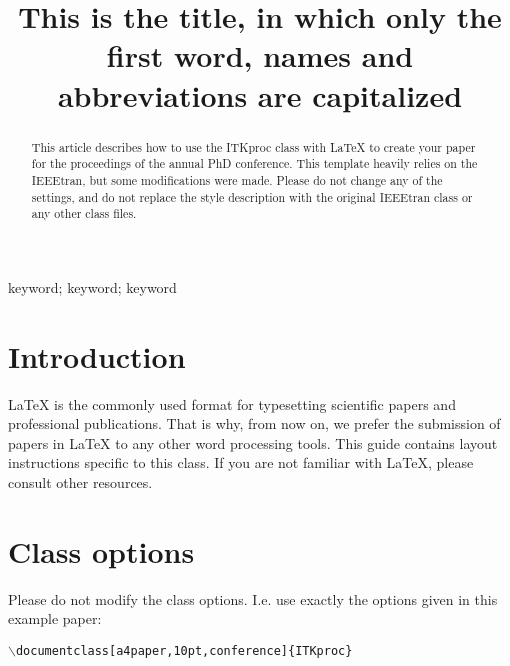 \documentclass[10pt, conference,a4paper]{ITKproc}
\begin{document}
%
\title{This is the title, in which only the first word, names and abbreviations are capitalized}

\author{
}

\maketitle

\begin{abstract}
This article describes how to use the ITKproc class with {\LaTeX} to create your paper for the proceedings of the annual PhD conference. This template heavily relies on the IEEEtran, but some modifications were made. Please do not change any of the settings, and do not replace the style description with the original IEEEtran class or any other class files.    

\end{abstract}
\begin{IEEEkeywords}
keyword; keyword; keyword
\end{IEEEkeywords}
\IEEEpeerreviewmaketitle

\section{Introduction}

{\LaTeX} is the commonly used format for typesetting scientific papers and professional publications. That is why, from now on, we prefer the submission of papers in {\LaTeX} to any other word processing tools. This guide contains layout instructions specific to this class. If you are not familiar with {\LaTeX}, please consult other resources.


\section{Class options}
Please do not modify the class options. I.e. use exactly the options given in this example paper:
\vspace{3mm}
\begin{small}
 \texttt{$\backslash$documentclass[a4paper,10pt,conference]\{ITKproc\}}
\end{small}
\end{document}
